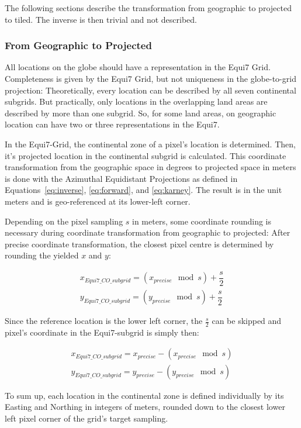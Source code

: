 \documentclass[10pt,a4paper]{article}
\begin{document}
The following sections describe the transformation from geographic to projected to tiled. The inverse is then trivial and not described.

\subsubsection*{From Geographic to Projected}
All locations on the globe should have a representation in the Equi7 Grid. Completeness is given by the Equi7 Grid, but not uniqueness in the globe-to-grid projection: Theoretically, every location can be described by all seven continental subgrids. But practically, only locations in the overlapping land areas are described by more than one subgrid. So, for some land areas, on geographic location can have two or three representations in the Equi7.

In the Equi7-Grid, the continental zone of a pixel's location is determined. Then, it's projected location in the continental subgrid is calculated. This coordinate transformation from the geographic space in degrees to projected space in meters is done with the Azimuthal Equidistant Projections as defined in Equations~\ref{eq:inverse}, \ref{eq:forward}, and \ref{eq:karney}. The result is in the unit meters and is geo-referenced at its lower-left corner.

Depending on the pixel sampling $s$ in meters, some coordinate rounding is necessary during coordinate transformation from geographic to projected: After precise coordinate transformation, the closest pixel centre is determined by rounding the yielded $x$ and $y$:

\begin{eqnarray}
x_{Equi7\_CO\_subgrid} = (x_{precise}\mod s) + \dfrac{s}{2} \\
y_{Equi7\_CO\_subgrid} = (y_{precise}\mod s) + \dfrac{s}{2}
\end{eqnarray}

Since the reference location is the lower left corner, the $\frac{s}{2}$ can be skipped and pixel's coordinate in the Equi7-subgrid is simply then:

\begin{eqnarray}
x_{Equi7\_CO\_subgrid} = x_{precise} - (x_{precise}\mod s) \\
y_{Equi7\_CO\_subgrid} = y_{precise} - (y_{precise}\mod s) 
\end{eqnarray}

To sum up, each location in the continental zone is defined individually by its Easting and Northing in integers of meters, rounded down to the closest lower left pixel corner of the grid's target sampling.
\end{document}
